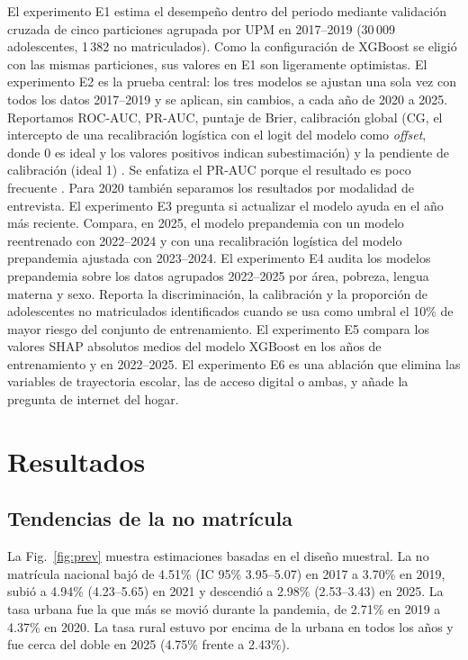 \documentclass[conference]{IEEEtran}
\begin{document}
El experimento E1 estima el desempeño dentro del periodo mediante validación cruzada de cinco particiones agrupada por UPM en 2017--2019 (30\,009 adolescentes, 1\,382 no matriculados). Como la configuración de XGBoost se eligió con las mismas particiones, sus valores en E1 son ligeramente optimistas. El experimento E2 es la prueba central: los tres modelos se ajustan una sola vez con todos los datos 2017--2019 y se aplican, sin cambios, a cada año de 2020 a 2025. Reportamos ROC-AUC, PR-AUC, puntaje de Brier, calibración global (CG, el intercepto de una recalibración logística con el logit del modelo como \textit{offset}, donde 0 es ideal y los valores positivos indican subestimación) y la pendiente de calibración (ideal 1) \cite{vancalster2019}. Se enfatiza el PR-AUC porque el resultado es poco frecuente \cite{saito2015}. Para 2020 también separamos los resultados por modalidad de entrevista. El experimento E3 pregunta si actualizar el modelo ayuda en el año más reciente. Compara, en 2025, el modelo prepandemia con un modelo reentrenado con 2022--2024 y con una recalibración logística del modelo prepandemia ajustada con 2023--2024. El experimento E4 audita los modelos prepandemia sobre los datos agrupados 2022--2025 por área, pobreza, lengua materna y sexo. Reporta la discriminación, la calibración y la proporción de adolescentes no matriculados identificados cuando se usa como umbral el 10\% de mayor riesgo del conjunto de entrenamiento. El experimento E5 compara los valores SHAP absolutos medios \cite{lundberg2017,lundberg2020} del modelo XGBoost en los años de entrenamiento y en 2022--2025. El experimento E6 es una ablación que elimina las variables de trayectoria escolar, las de acceso digital o ambas, y añade la pregunta de internet del hogar.

\section{Resultados}

\subsection{Tendencias de la no matrícula}
La Fig.~\ref{fig:prev} muestra estimaciones basadas en el diseño muestral. La no matrícula nacional bajó de 4.51\% (IC 95\% 3.95--5.07) en 2017 a 3.70\% en 2019, subió a 4.94\% (4.23--5.65) en 2021 y descendió a 2.98\% (2.53--3.43) en 2025. La tasa urbana fue la que más se movió durante la pandemia, de 2.71\% en 2019 a 4.37\% en 2020. La tasa rural estuvo por encima de la urbana en todos los años y fue cerca del doble en 2025 (4.75\% frente a 2.43\%).
\end{document}

